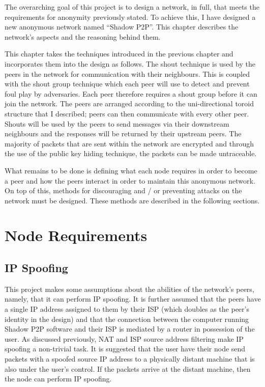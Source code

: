 \documentclass[ %
                    author={Luke Murray},
                supervisor={Dr. Simon Hollis},
                     title={Shadow Peer-to-Peer Networks},
                  subtitle={},
                    degree={MEng},
                      year={2013} ]{thesis}
\begin{document}

The overarching goal of this project is to design a network, in full, that meets the requirements for anonymity previously stated. To achieve this, I have designed a new anonymous network named ``Shadow P2P''. This chapter describes the network's aspects and the reasoning behind them.

This chapter takes the techniques introduced in the previous chapter and incorporates them into the design as follows. The shout technique is used by the peers in the network for communication with their neighbours. This is coupled with the shout group technique which each peer will use to detect and prevent foul play by adversaries. Each peer therefore requires a shout group before it can join the network. The peers are arranged according to the uni-directional toroid structure that I described; peers can then communicate with every other peer. Shouts will be used by the peers to send messages via their downstream neighbours and the responses will be returned by their upstream peers. The majority of packets that are sent within the network are encrypted and through the use of the public key hiding technique, the packets can be made untraceable.

What remains to be done is defining what each node requires in order to become a peer and how the peers interact in order to maintain this anonymous network. On top of this, methods for discouraging and / or preventing attacks on the network must be designed. These methods are described in the following sections.

\section{Node Requirements}
\subsection{IP Spoofing}

This project makes some assumptions about the abilities of the network's peers, namely, that it can perform IP spoofing. It is further assumed that the peers have a single IP address assigned to them by their ISP (which doubles as the peer's identity in the design) and that the connection between the computer running Shadow P2P software and their ISP is mediated by a router in possession of the user. As discussed previously, NAT and ISP source address filtering make IP spoofing a non-trivial task. It is suggested that the user have their node send packets with a spoofed source IP address to a physically distant machine that is also under the user's control. If the packets arrive at the distant machine, then the node can perform IP spoofing.
\end{document}
